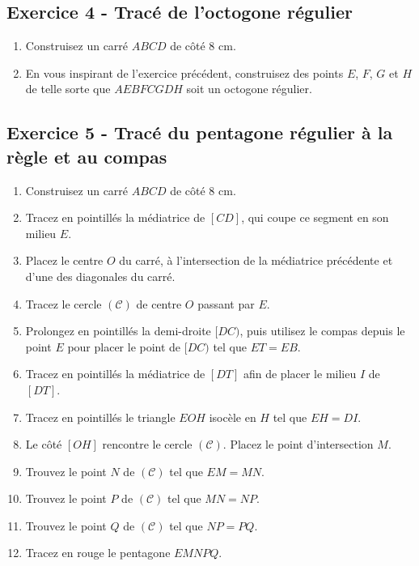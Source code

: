 \documentclass[14 pt]{extarticle}
\theoremstyle{plain}
\begin{document}
\subsection*{Exercice 4 - Tracé de l'octogone régulier}


\begin{enumerate}

\item Construisez un carré $ABCD$ de côté $8$ cm. 
\item En vous inspirant de l'exercice précédent, construisez des points $E$, $F$, $G$ et $H$ de telle sorte que $AEBFCGDH$ soit un octogone régulier.
\end{enumerate}


\subsection*{Exercice 5 - Tracé du pentagone régulier à la règle et au compas}


\begin{enumerate}

\item Construisez un carré $ABCD$ de côté $8$ cm. 
\item Tracez en pointillés la médiatrice de $[CD]$, qui coupe ce segment en son milieu $E$. 
\item Placez le centre $O$ du carré, à l'intersection de la médiatrice précédente et d'une des diagonales du carré. 
\item Tracez le cercle $(\mathcal C)$ de centre $O$ passant par $E$. 
\item Prolongez en pointillés la demi-droite $[DC)$, puis utilisez le compas depuis le point $E$ pour placer le point de $[DC)$ tel que $ET=EB$. 
\item Tracez en pointillés la médiatrice de $[DT]$ afin de placer le milieu $I$ de $[DT]$. 
\item Tracez en pointillés le triangle $EOH$ isocèle en $H$ tel que $EH= DI$. 
\item Le côté $[OH]$ rencontre le cercle $(\mathcal C)$. Placez le point d'intersection $M$.
\item Trouvez le point $N$ de $(\mathcal C)$ tel que $EM= MN$. 
\item Trouvez le point $P$ de $(\mathcal C)$ tel que $MN=NP$. 
\item Trouvez le point $Q$ de $(\mathcal C)$ tel que $NP=PQ$. 
\item Tracez en rouge le pentagone $EMNPQ$. 
\end{enumerate}
\end{document}
